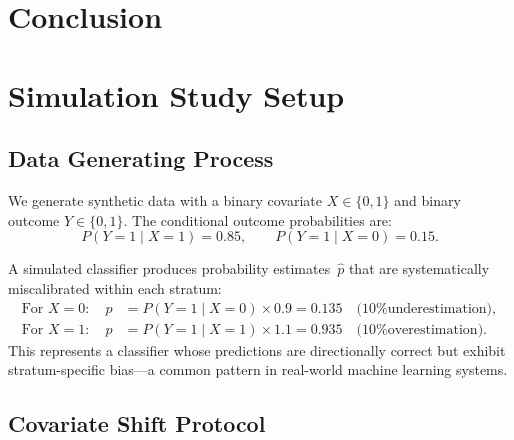 \documentclass[12pt]{article}
\begin{document}
\section{Conclusion}





\appendix
\section{Simulation Study Setup}
\label{app:simulation}

\subsection{Data Generating Process}

We generate synthetic data with a binary covariate $X \in \{0, 1\}$ and
binary outcome $Y \in \{0, 1\}$. The conditional outcome probabilities
are:
\[
  P(Y=1 \mid X=1) = 0.85, \qquad P(Y=1 \mid X=0) = 0.15.
\]

A simulated classifier produces probability estimates~$\hat{p}$ that are
systematically miscalibrated within each stratum:
\begin{align*}
  \text{For } X=0: \quad \hat{p} &= P(Y=1 \mid X=0) \times 0.9 = 0.135
    \quad \text{(10\% underestimation)}, \\
  \text{For } X=1: \quad \hat{p} &= P(Y=1 \mid X=1) \times 1.1 = 0.935
    \quad \text{(10\% overestimation)}.
\end{align*}
This represents a classifier whose predictions are directionally correct
but exhibit stratum-specific bias---a common pattern in real-world machine
learning systems.

\subsection{Covariate Shift Protocol}
\end{document}
